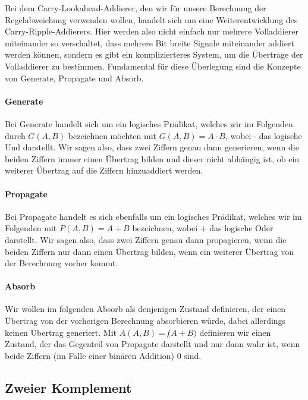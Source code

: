 \documentclass{report}
\begin{document}
Bei dem Carry-Lookahead-Addierer, den wir für unsere Berechnung der Regelabweichung verwenden wollen, handelt sich um eine Weiterentwicklung des Carry-Ripple-Addierers. Hier werden also nicht einfach nur mehrere Volladdierer miteinander so verschaltet, dass mehrere Bit breite Signale miteinander addiert werden können, sondern es gibt ein komplizierteres System, um die Übertrage der Volladdierer zu bestimmen. Fundamental für diese Überlegung sind die Konzepte von Generate, Propagate und Absorb.\cite{skript}

\paragraph{Generate}

Bei Generate handelt sich um ein logisches Prädikat, welches wir im Folgenden durch $G(A, B)$ bezeichnen möchten mit $G(A,B) = A \cdot B$, wobei $\cdot$ das logische Und darstellt. Wir sagen also, dass zwei Ziffern genau dann generieren, wenn die beiden Ziffern immer einen Übertrag bilden und dieser nicht abhängig ist, ob ein weiterer Übertrag auf die Ziffern hinzuaddiert werden.

\paragraph{Propagate}

Bei Propagate handelt es sich ebenfalls um ein logisches Prädikat, welches wir im Folgenden mit $P(A,B) = A + B$ bezeichnen, wobei $+$ das logische Oder darstellt. Wir sagen also, dass zwei Ziffern genau dann propagieren, wenn die beiden Ziffern nur dann einen Übertrag bilden, wenn ein weiterer Übertrag von der Berechnung vorher kommt.

\paragraph{Absorb}

Wir wollen im folgenden Absorb als denjenigen Zustand definieren, der einen Übertrag von der vorherigen Berechnung absorbieren würde, dabei allerdings keinen Übertrag generiert. Mit $A(A,B) = \not(A + B)$ definieren wir einen Zustand, der das Gegenteil von Propagate darstellt und nur dann wahr ist, wenn beide Ziffern (im Falle einer binären Addition) $0$ sind.

\subsection{Zweier Komplement}
\label{sec:zweier-komplement}
\end{document}
